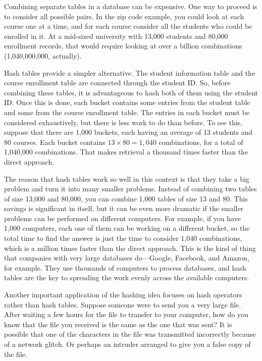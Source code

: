 Combining separate tables in a database can be expensive.
One way to proceed is to consider all possible pairs.
In the zip code example, you could look at each course
one at a time, and for each course consider
all the students who could be enrolled in it.
At a mid-sized university with 13,000 students
and 80,000 enrollment records, that would require
looking at over a billion combinations (1,040,000,000, actually).

Hash tables provide a simpler alternative. The student information table
and the course enrollment table are connected through the student ID.
So, before combining these tables, it is advantageous to hash both of them
using the student ID. Once this is done, each bucket contains some entries
from the student table and some from the course enrollment table. The entries
in each bucket must be considered exhaustively, but there is less work to do
than before.
To see this, suppose that there are 1,000 buckets,
each having an average of 13 students and 80 courses. Each bucket
contains $13 \times 80 =1{,}040$ combinations,
for a total of 1,040,000 combinations.
That makes retrieval a thousand times faster than the direct approach.

The reason that hash tables work so well in this context is that they take
a big problem and turn it into many smaller problems. Instead
of combining two tables of size 13,000 and 80,000, you can combine 1,000
tables of size 13 and 80. This savings is significant in itself, but it can
be even more dramatic if the smaller problems can be performed on different
computers. For example, if you have 1,000 computers, each one of them can be
working on a different bucket, so the total time to find the answer is
just the time to consider 1,040 combinations, which is a million times
faster than the direct approach.
This is the kind of thing that companies
with very large databases do---Google, Facebook, and Amazon, for example.
They use thousands of computers to process databases, and
hash tables are the key to spreading
the work evenly across the available computers.

Another important application of the hashing idea focuses on hash operators
rather than hash tables.
Suppose someone were to send you a very large file.
After waiting a few hours
for the file to transfer to your computer, how do you know that the file
you received is the same as the one that was sent?
It is possible that one of the characters
in the file was transmitted incorrectly because of a network glitch.
Or perhaps an intruder arranged to give you a false copy of the file.

